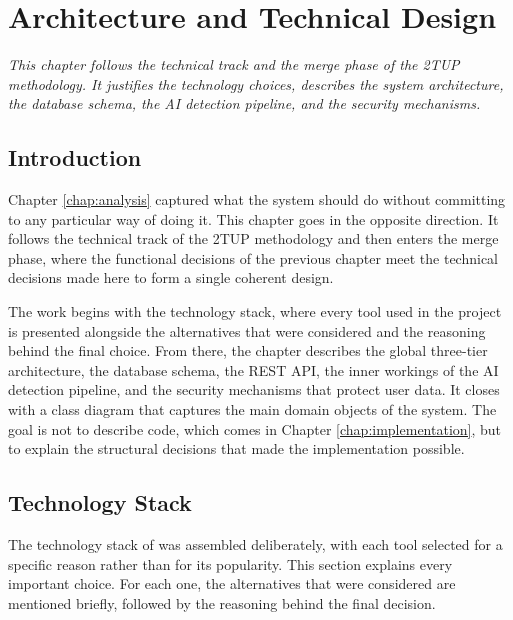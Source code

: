 
\chapter{Architecture and Technical Design}
\label{chap:design}

\textit{This chapter follows the technical track and the merge phase of the 2TUP methodology. It justifies the technology choices, describes the system architecture, the database schema, the AI detection pipeline, and the security mechanisms.}

\vspace{0.8cm}

\section{Introduction}

Chapter \ref{chap:analysis} captured what the system should do without committing to any particular way of doing it. This chapter goes in the opposite direction. It follows the technical track of the 2TUP methodology and then enters the merge phase, where the functional decisions of the previous chapter meet the technical decisions made here to form a single coherent design.

The work begins with the technology stack, where every tool used in the project is presented alongside the alternatives that were considered and the reasoning behind the final choice. From there, the chapter describes the global three-tier architecture, the database schema, the REST API, the inner workings of the AI detection pipeline, and the security mechanisms that protect user data. It closes with a class diagram that captures the main domain objects of the system. The goal is not to describe code, which comes in Chapter \ref{chap:implementation}, but to explain the structural decisions that made the implementation possible.

\section{Technology Stack}

The technology stack of \deepguard{} was assembled deliberately, with each tool selected for a specific reason rather than for its popularity. This section explains every important choice. For each one, the alternatives that were considered are mentioned briefly, followed by the reasoning behind the final decision.

